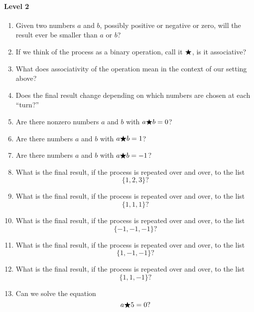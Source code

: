 \documentclass[handout,nooutcomes]{ximera}
\begin{document}
\begin{problem}
\begin{freeResponse}
  \paragraph{Level 2}
  \begin{enumerate}
    \item Given two numbers $a$ and $b$, possibly positive or negative
      or zero, will the result ever be smaller than $a$ or $b$?
    \item If we think of the process as a binary operation, call it
      $\bigstar$, is it associative?
    \item What does associativity of the operation mean in the context
      of our setting above?
    \item Does the final result change depending on which numbers are
      chosen at each ``turn?''
    \item Are there nonzero numbers $a$ and $b$ with $a\bigstar b = 0$?
    \item Are there numbers $a$ and $b$ with $a\bigstar b = 1$?
    \item Are there numbers $a$ and $b$ with $a\bigstar b = -1$?
    \item What is the final result, if the process is repeated over
      and over, to the list
      \[
      \{1,2,3\}?
      \]
    \item What is the final result, if the process is repeated over
      and over, to the list
      \[
      \{1,1,1\}?
      \]
    \item What is the final result, if the process is repeated over
      and over, to the list
      \[
      \{-1,-1,-1\}?
      \]
    \item What is the final result, if the process is repeated over
      and over, to the list
      \[
      \{1,-1,-1\}?
      \]
  \item What is the final result, if the process is repeated over
      and over, to the list
      \[
      \{1,1,-1\}?
      \]
    \item Can we solve the equation
      \[
      a\bigstar 5 = 0?
      \]
\end{enumerate}


\end{freeResponse}
\end{problem}
\end{document}

